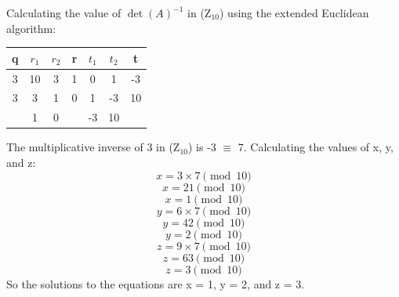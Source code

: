 \documentclass[a4paper]{exam}
\begin{document}
\begin{questions}
\begin{solution}
\begin{parts}
                Calculating the value of $\det(A)^{-1}$ in ($\text{Z}_{10}$) using the extended Euclidean algorithm:
                \begin{table}[H]
                    \begin{center}
                        \begin{tabular}{|c|c|c|c|c|c|c|}
                        \hline
                        \textbf{q}               & \textbf{$r_1$} & \textbf{$r_2$} & \textbf{r}               & \textbf{$t_1$} & \textbf{$t_2$} & \textbf{t}               \\ \hline
                        3                        & 10             & 3              & 1                        & 0              & 1              & -3                       \\ \hline
                        3                        & 3              & 1              & 0                        & 1              & -3             & 10                       \\ \hline
                                                 & 1              & 0              &                          & -3             & 10             &                          \\ \hline
                        \end{tabular}
                    \end{center}
                \end{table}
                The multiplicative inverse of 3 in ($\text{Z}_{10}$) is -3 $\equiv$ 7.
                Calculating the values of x, y, and z:
                \[
                    x = 3 \times 7 \pmod{10}
                \]
                \[
                    x = 21 \pmod{10}
                \]
                \[
                    x = 1 \pmod{10}
                \]
                \[
                    y = 6 \times 7 \pmod{10}
                \]
                \[
                    y = 42 \pmod{10}
                \]
                \[
                    y = 2 \pmod{10}
                \]
                \[
                    z = 9 \times 7 \pmod{10}
                \]
                \[
                    z = 63 \pmod{10}
                \]
                \[
                    z = 3 \pmod{10}
                \]
                So the solutions to the equations are x = 1, y = 2, and z = 3.
            \end{parts}
        \end{solution}
    \end{questions}
\end{document}

